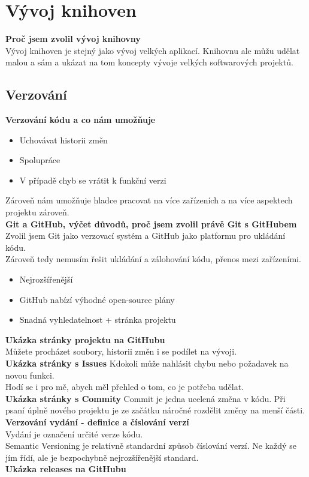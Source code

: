 \section{Vývoj knihoven} {
  \textbf{Proč jsem zvolil vývoj knihovny} \\
  Vývoj knihoven je stejný jako vývoj velkých aplikací. Knihovnu ale můžu udělat malou a sám a ukázat na tom koncepty vývoje velkých softwarových projektů. \\
  \subsection {Verzování}
  \textbf{Verzování kódu a co nám umožňuje} \\
  \begin{itemize}
      \item Uchovávat historii změn
      \item Spolupráce
      \item V případě chyb se vrátit k funkční verzi
  \end{itemize}
  Zároveň nám umožňuje hladce pracovat na více zařízeních a na více aspektech projektu zároveň. \\
  \textbf{Git a GitHub, výčet důvodů, proč jsem zvolil právě Git s GitHubem} \\
  Zvolil jsem Git jako verzovací systém a GitHub jako platformu pro ukládání kódu. \\
  Zároveň tedy nemusím řešit ukládání a zálohování kódu, přenos mezi zařízeními. \\
  \begin{itemize}
      \item Nejrozšířenější
      \item GitHub nabízí výhodné open-source plány
      \item Snadná vyhledatelnost + stránka projektu
  \end{itemize}
  \textbf{Ukázka stránky projektu na GitHubu} \\
  Můžete procházet soubory, historii změn i se podílet na vývoji. \\
  \textbf{Ukázka stránky s Issues}
  Kdokoli může nahlásit chybu nebo požadavek na novou funkci. \\
  Hodí se i pro mě, abych měl přehled o tom, co je potřeba udělat. \\
  \textbf{Ukázka stránky s Commity}
  Commit je jedna ucelená změna v kódu. Při psaní úplně nového projektu je ze začátku náročné rozdělit změny na menší části. \\
  \textbf{Verzování vydání - definice a číslování verzí} \\
  Vydání je označení určité verze kódu. \\
  Semantic Versioning je relativně standardní způsob číslování verzí. Ne každý se jím řídí, ale je bezpochybně nejrozšířenější standard. \\
  \textbf{Ukázka releases na GitHubu} \\
}
